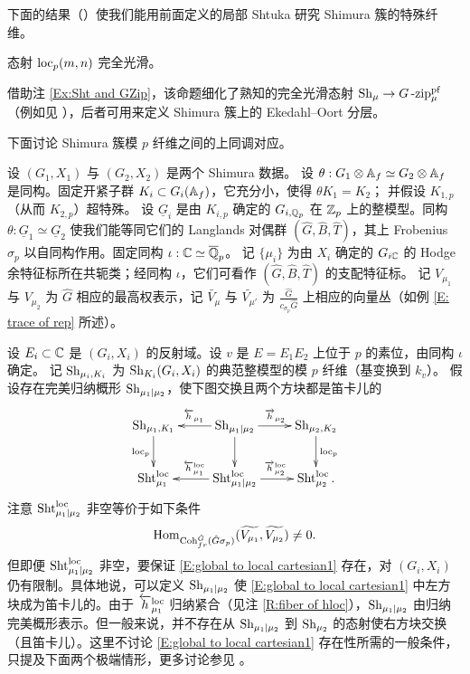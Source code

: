 下面的结果（\cite[命题 7.2.4]{XZ}）使我们能用前面定义的局部 Shtuka 研究 Shimura 簇的特殊纤维。

\begin{prop}\label{smoothness}
态射 $\mathrm{loc}_p(m,n)$ 完全光滑。
\end{prop}
\begin{rmk}
借助注 \ref{Ex:Sht and GZip}，该命题细化了熟知的完全光滑态射 $\operatorname{Sh}_\mu\to G\operatorname{-zip}^{\operatorname{pf}}_\mu$（例如见 \cite{Zha}），后者可用来定义 Shimura 簇上的 Ekedahl–Oort 分层。
\end{rmk}

下面讨论 Shimura 簇模 $p$ 纤维之间的上同调对应。

设 $(G_1,X_1)$ 与 $(G_2,X_2)$ 是两个 Shimura 数据。
设 $\theta: G_1\otimes{\mathbb A}_f\simeq G_2\otimes{\mathbb A}_f$ 是同构。固定开紧子群 $K_i\subset G_i({\mathbb A}_f)$，它充分小，使得 $\theta K_1=K_2$；
并假设 $K_{1,p}$（从而 $K_{2,p}$）超特殊。
设 $\underline G_i$ 是由 $K_{i,p}$ 确定的 $G_{i,{\mathbb Q}_p}$ 在 ${\mathbb Z}_{p}$ 上的整模型。同构 $\theta: \underline G_1\simeq \underline G_2$ 使我们能等同它们的 Langlands 对偶群 $(\hat G,\hat B,\hat T)$，其上 Frobenius $\sigma_p$ 以自同构作用。固定同构 $\iota: {\mathbb C}\simeq \overline{{\mathbb Q}}_p$。
记 $\{\mu_i\}$ 为由 $X_i$ 确定的 $G_{i{\mathbb C}}$ 的 Hodge 余特征标所在共轭类；经同构 $\iota$，它们可看作 $(\hat G,\hat B,\hat T)$ 的支配特征标。
记 $V_{\mu_1}$ 与 $V_{\mu_2}$ 为 $\hat G$ 相应的最高权表示，记 $\widetilde{V_{\mu}}$ 与 $\widetilde{V_{\mu'}}$ 为 $\frac{\hat G}{c_{\sigma_p}\hat G}$ 上相应的向量丛（如例 \ref{E: trace of rep} 所述）。

设 $E_i\subset {\mathbb C}$ 是 $(G_i,X_i)$ 的反射域。设 $v$ 是 $E=E_1E_2$ 上位于 $p$ 的素位，由同构 $\iota$ 确定。
记 $\operatorname{Sh}_{\mu_i,K_i}$ 为 $\operatorname{Sh}_{K_i}(G_i,X_i)$ 的典范整模型的模 $p$ 纤维（基变换到 $k_{v}$）。
假设存在完美归纳概形 $\operatorname{Sh}_{\mu_1|\mu_2}$，使下图交换且两个方块都是笛卡儿的
\begin{equation}
\label{E:global to local cartesian1}
\xymatrix{
\Sh_{\mu_1,K_1} \ar_{\loc_p}[d] & \ar_{\overleftarrow{h}_{\mu_1}}[l] \Sh_{\mu_1|\mu_2} \ar^{\overrightarrow{h}_{\mu_2}}[r] \ar[d] & \Sh_{\mu_2,K_2} \ar^{\loc_p}[d] \\
\Sht_{\mu_1}^\loc & \ar_{\overleftarrow{h}_{\mu_1}^\loc}[l] \Sht_{\mu_1|\mu_2}^{\loc} \ar^{\overrightarrow{h}_{\mu_2}^\loc}[r]& \Sht_{\mu_2}^\loc.
}
\end{equation}
注意 $\operatorname{Sht}_{\mu_1\mid\mu_2}^{\mathrm{loc}}$ 非空等价于如下条件
\begin{equation}
\label{E: exotic p}
{\operatorname{Hom}}_{{\operatorname{Coh}}^{\hat G}_{fr}(\hat G\sigma_p)}(\widetilde{V_{\mu_1}},\widetilde{V_{\mu_2}})\neq 0.
\end{equation}
但即便 $\operatorname{Sht}_{\mu_1\mid\mu_2}^{\mathrm{loc}}$ 非空，要保证 \eqref{E:global to local cartesian1} 存在，对 $(G_i,X_i)$ 仍有限制。具体地说，可以定义 $\operatorname{Sh}_{\mu_1\mid\mu_2}$ 使 \eqref{E:global to local cartesian1} 中左方块成为笛卡儿的。由于 $\overleftarrow{h}^{\mathrm{loc}}_{\mu_1}$ 归纳紧合（见注 \ref{R:fiber of hloc}），$\operatorname{Sh}_{\mu_1\mid\mu_2}$ 由归纳完美概形表示。但一般来说，并不存在从 $\operatorname{Sh}_{\mu_1\mid\mu_2}$ 到 $\operatorname{Sh}_{\mu_2}$ 的态射使右方块交换（且笛卡儿）。这里不讨论 \eqref{E:global to local cartesian1} 存在性所需的一般条件，只提及下面两个极端情形，更多讨论参见 \cite{XZ}。
